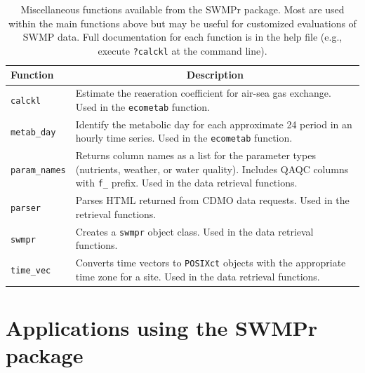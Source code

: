 \documentclass[10pt,letterpaper]{article}\usepackage[]{graphicx}\usepackage[]{color}
\begin{document}
\begin{table}[!tbp]
\caption{Miscellaneous functions available from the SWMPr package.  Most are used within the main functions above but may be useful for customized evaluations of \gls{SWMP} data.  Full documentation for each function is in the help file (e.g., execute \texttt{?calckl} at the command line).\label{tab:misc}} 
\begin{center}
\begin{tabular}{lp{3.5in}}
\hline\hline
\multicolumn{1}{l}{Function}&\multicolumn{1}{c}{Description}\tabularnewline
\hline
\texttt{calckl}&Estimate the reaeration coefficient for air-sea gas exchange.  Used in the \texttt{ecometab} function.\tabularnewline
\texttt{metab\_day}&Identify the metabolic day for each approximate 24 period in an hourly time series.  Used in the \texttt{ecometab} function.\tabularnewline
\texttt{param\_names}&Returns column names as a list for the parameter types (nutrients, weather, or water quality).  Includes \gls{QAQC} columns with \texttt{f\_} prefix. Used in the data retrieval functions.\tabularnewline
\texttt{parser}&Parses HTML returned from \gls{CDMO} data requests.  Used in the retrieval functions.\tabularnewline
\texttt{swmpr}&Creates a \texttt{swmpr} object class.  Used in the data retrieval functions.\tabularnewline
\texttt{time\_vec}&Converts time vectors to \texttt{POSIXct} objects with the appropriate time zone for a site.  Used in the data retrieval functions.\tabularnewline
\hline
\end{tabular}\end{center}

\end{table}


\section*{Applications using the SWMPr package}
\label{swmp_apps}
\end{document}
